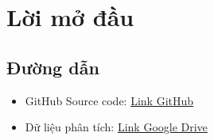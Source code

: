 \chapter*{Lời mở đầu}
\section*{Đường dẫn}
\begin{itemize}
\item GitHub Source code: \href{https://github.com/Legend0fHell/ait2006-data-processing-final}{Link GitHub}
\item Dữ liệu phân tích: \href{https://drive.google.com/drive/folders/1gSbAPnw15t1MHvt4yZVtHRROlKMQ6EcK?usp=sharing}{Link Google Drive}
\end{itemize}

